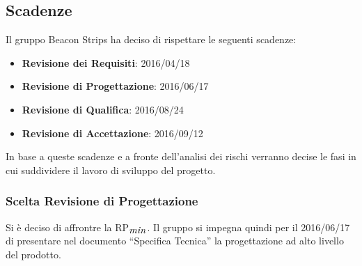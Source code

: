 	\subsection{Scadenze}
	Il gruppo Beacon Strips ha deciso di rispettare le seguenti scadenze:
	\begin{itemize}
		\item \textbf{Revisione dei Requisiti}: 2016/04/18
		\item \textbf{Revisione di Progettazione}: 2016/06/17
		\item \textbf{Revisione di Qualifica}: 2016/08/24
		\item \textbf{Revisione di Accettazione}: 2016/09/12
	\end{itemize}
	In base a queste scadenze e a fronte dell'analisi dei rischi verranno decise le fasi in cui suddividere il lavoro di sviluppo del progetto.
	\subsubsection{Scelta Revisione di Progettazione}
	Si è deciso di affrontre la RP$_{\mbox{\textit{min}}}$. Il gruppo si impegna quindi per il 2016/06/17 di presentare nel documento ``Specifica Tecnica'' la progettazione ad alto livello del prodotto.
	